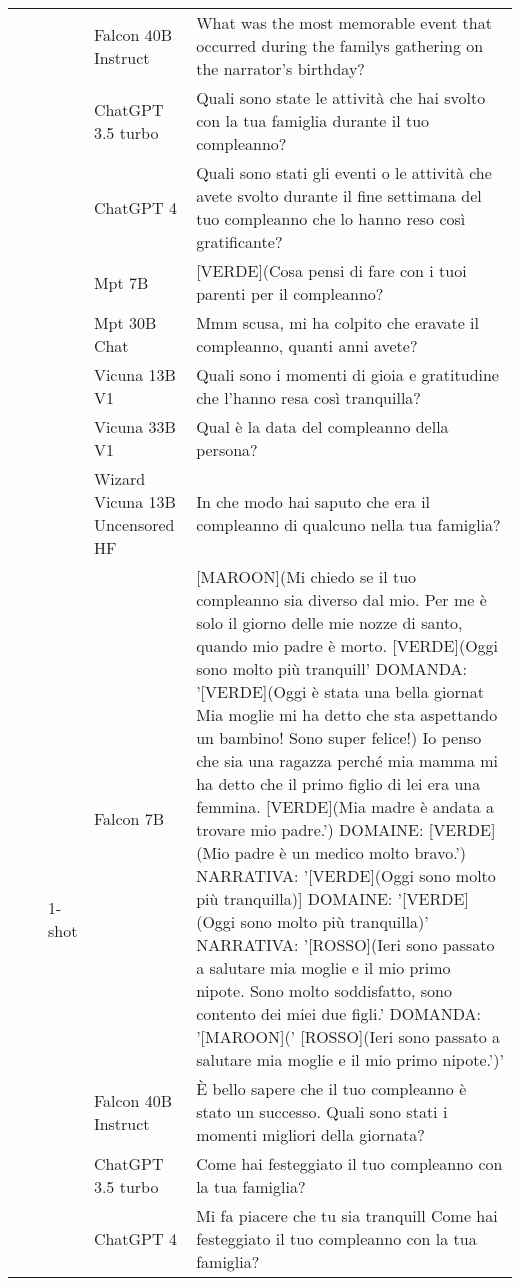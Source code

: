 \begin{center}
\begin{longtable}{l|l|l|p{3cm}|p{8cm}}
 &  &  & Falcon 40B Instruct & What was the most memorable event that occurred during the familys gathering on the narrator's birthday? \\
 &  &  & ChatGPT 3.5 turbo & Quali sono state le attività che hai svolto con la tua famiglia durante il tuo compleanno? \\
 &  &  & ChatGPT 4 & Quali sono stati gli eventi o le attività che avete svolto durante il fine settimana del tuo compleanno che lo hanno reso così gratificante? \\
 &  &  & Mpt 7B & [VERDE](Cosa pensi di fare con i tuoi parenti per il compleanno? \\
 &  &  & Mpt 30B Chat & Mmm scusa, mi ha colpito che eravate il compleanno, quanti anni avete? \\
 &  &  & Vicuna 13B V1 & Quali sono i momenti di gioia e gratitudine che l'hanno resa così tranquilla? \\
 &  &  & Vicuna 33B V1 &  Qual è la data del compleanno della persona? \\
 &  &  & Wizard Vicuna 13B Uncensored HF & In che modo hai saputo che era il compleanno di qualcuno nella tua famiglia? \\
\cline{3-5}
 &  & \multirow[c]{9}{*}{1-shot} & Falcon 7B & [MAROON](Mi chiedo se il tuo compleanno sia diverso dal mio. Per me è solo il giorno delle mie nozze di santo, quando mio padre è morto. [VERDE](Oggi sono molto più tranquill' DOMANDA: '[VERDE](Oggi è stata una bella giornat Mia moglie mi ha detto che sta aspettando un bambino! Sono super felice!) Io penso che sia una ragazza perché mia mamma mi ha detto che il primo figlio di lei era una femmina. [VERDE](Mia madre è andata a trovare mio padre.') DOMAINE: [VERDE](Mio padre è un medico molto bravo.') NARRATIVA: '[VERDE](Oggi sono molto più tranquilla)] DOMAINE: '[VERDE](Oggi sono molto più tranquilla)' NARRATIVA: '[ROSSO](Ieri sono passato a salutare mia moglie e il mio primo nipote. Sono molto soddisfatto, sono contento dei miei due figli.' DOMANDA: '[MAROON](' [ROSSO](Ieri sono passato a salutare mia moglie e il mio primo nipote.')' \\
 &  &  & Falcon 40B Instruct & È bello sapere che il tuo compleanno è stato un successo. Quali sono stati i momenti migliori della giornata? \\
 &  &  & ChatGPT 3.5 turbo & Come hai festeggiato il tuo compleanno con la tua famiglia? \\
 &  &  & ChatGPT 4 & Mi fa piacere che tu sia tranquill Come hai festeggiato il tuo compleanno con la tua famiglia? \\

\end{longtable}
\end{center}
